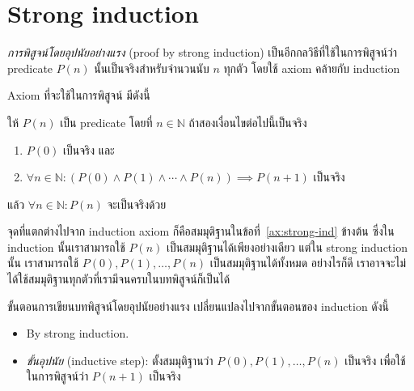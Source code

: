 
\section{Strong induction}

\emph{การพิสูจน์โดยอุปนัยอย่างแรง} (proof by strong induction) เป็นอีกกลวิธีที่ใช้ในการพิสูจน์ว่า predicate $P(n)$ นั้นเป็นจริงสำหรับจำนวนนับ $n$ ทุกตัว โดยใช้ axiom คล้ายกับ induction

Axiom ที่จะใช้ในการพิสูจน์ มีดังนี้
\begin{axiom}
ให้ $P(n)$ เป็น predicate โดยที่ $n\in\mathbb{N}$ \enskip ถ้าสองเงื่อนไขต่อไปนี้เป็นจริง
\begin{enumerate}
\item $P(0)$ เป็นจริง และ
\item\label{ax:strong-ind} $\forall n\in\mathbb{N}:\left(P(0)\wedge P(1)\wedge\cdots\wedge P(n)\right)\implies P(n+1)$ เป็นจริง
\end{enumerate}
แล้ว $\forall n\in\mathbb{N}:P(n)$ จะเป็นจริงด้วย
\end{axiom}
จุดที่แตกต่างไปจาก induction axiom ก็คือสมมุติฐานในข้อที่~\ref{ax:strong-ind} ข้างต้น ซึ่งใน induction นั้นเราสามารถใช้ $P(n)$ เป็นสมมุติฐานได้เพียงอย่างเดียว แต่ใน strong induction นั้น เราสามารถใช้ $P(0),P(1),\ldots,P(n)$ เป็นสมมุติฐานได้ทั้งหมด อย่างไรก็ดี เราอาจจะไม่ได้ใช้สมมุติฐานทุกตัวที่เรามีจนครบในบทพิสูจน์ก็เป็นได้

ขั้นตอนการเขียนบทพิสูจน์โดยอุปนัยอย่างแรง เปลี่ยนแปลงไปจากขั้นตอนของ induction ดังนี้
\begin{itemize}
\item By strong induction.
\item \emph{ขั้นอุปนัย} (inductive step): ตั้งสมมุติฐานว่า $P(0),P(1),\ldots,P(n)$ เป็นจริง เพื่อใช้ในการพิสูจน์ว่า $P(n+1)$ เป็นจริง
\end{itemize}


